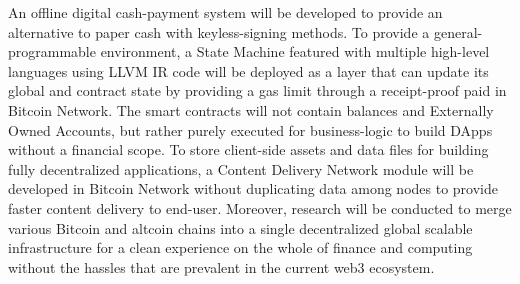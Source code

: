\documentclass[a4paper, 10pt]{extarticle}
\begin{document}
An offline digital cash-payment system will be developed to provide an alternative to paper cash with keyless-signing methods. To provide a general-programmable environment, a State Machine \cite{wood2014ethereum} featured with multiple high-level languages using LLVM \cite{llvm} IR code will be deployed as a layer that can update its global and contract state by providing a gas limit through a receipt-proof paid in Bitcoin Network. The smart contracts will not contain balances and Externally Owned Accounts, but rather purely executed for business-logic to build DApps without a financial scope. To store client-side assets and data files for building fully decentralized applications, a Content Delivery Network module will be developed in Bitcoin Network without duplicating data among nodes to provide faster content delivery to end-user. Moreover, research will be conducted to merge various Bitcoin and altcoin chains into a single decentralized global scalable infrastructure for a clean experience on the whole of finance and computing without the hassles that are prevalent in the current web3 ecosystem.


\end{document}
